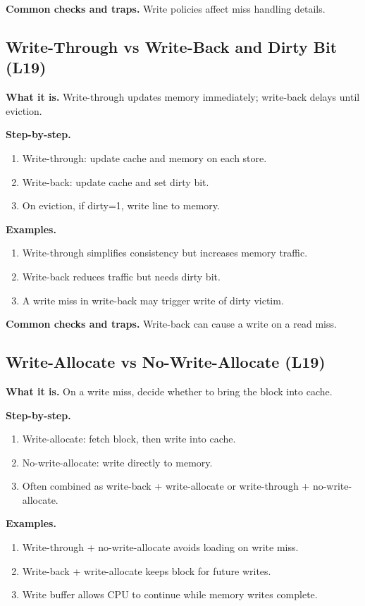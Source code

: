 \documentclass[11pt]{article}
\begin{document}
\textbf{Common checks and traps.} Write policies affect miss handling details.

\subsection{Write-Through vs Write-Back and Dirty Bit (L19)}
\textbf{What it is.} Write-through updates memory immediately; write-back delays until eviction.

\textbf{Step-by-step.}
\begin{enumerate}[leftmargin=*]
  \item Write-through: update cache and memory on each store.
  \item Write-back: update cache and set dirty bit.
  \item On eviction, if dirty=1, write line to memory.
\end{enumerate}

\textbf{Examples.}
\begin{enumerate}[leftmargin=*]
  \item Write-through simplifies consistency but increases memory traffic.
  \item Write-back reduces traffic but needs dirty bit.
  \item A write miss in write-back may trigger write of dirty victim.
\end{enumerate}

\textbf{Common checks and traps.} Write-back can cause a write on a read miss.

\subsection{Write-Allocate vs No-Write-Allocate (L19)}
\textbf{What it is.} On a write miss, decide whether to bring the block into cache.

\textbf{Step-by-step.}
\begin{enumerate}[leftmargin=*]
  \item Write-allocate: fetch block, then write into cache.
  \item No-write-allocate: write directly to memory.
  \item Often combined as write-back + write-allocate or write-through + no-write-allocate.
\end{enumerate}

\textbf{Examples.}
\begin{enumerate}[leftmargin=*]
  \item Write-through + no-write-allocate avoids loading on write miss.
  \item Write-back + write-allocate keeps block for future writes.
  \item Write buffer allows CPU to continue while memory writes complete.
\end{enumerate}
\end{document}
